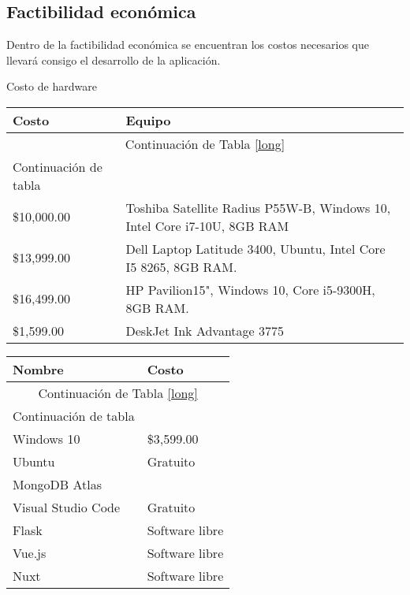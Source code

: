 
\subsection*{Factibilidad económica}
Dentro de la factibilidad económica se encuentran los costos necesarios que llevará consigo el desarrollo de la aplicación.


Costo de hardware
\begin{longtable}{  p{2.5cm} | p{6cm} }	
	
	\hline
	
	\textbf{Costo } & \textbf{Equipo }  \\
	\hline
	\hline
	
	\endfirsthead
	
	\multicolumn{2}{c}{Continuación de Tabla \ref{long}}\\
	\hline
	Continuación de tabla\\
	\hline
	\endhead
	
	\hline
	\endfoot
		
	\$10,000.00 & Toshiba Satellite Radius P55W-B, Windows 10, Intel Core i7-10U, 8GB RAM\\
	\$13,999.00 & Dell Laptop Latitude 3400, Ubuntu, Intel Core I5 8265, 8GB RAM.\\
	\$16,499.00 & HP Pavilion15", Windows 10, Core i5-9300H, 8GB RAM.\\
	\$1,599.00 & DeskJet Ink Advantage 3775\\
	
\end{longtable}



\begin{longtable}{ l | l }	
	
	\hline
	
	\textbf{Nombre } & \textbf{Costo } \\
	\hline
	\hline
	
	\endfirsthead
	
	\multicolumn{2}{c}{Continuación de Tabla \ref{long}}\\
	\hline
	Continuación de tabla\\
	\hline
	\endhead
	
	\hline
	\endfoot
	
	 Windows 10 & \$3,599.00\\
	 Ubuntu & Gratuito\\
	 MongoDB Atlas & \\
	 Visual Studio Code & Gratuito\\
	 Flask & Software libre\\
	 Vue.js & Software libre\\
	 Nuxt & Software libre\\
	
\end{longtable}


